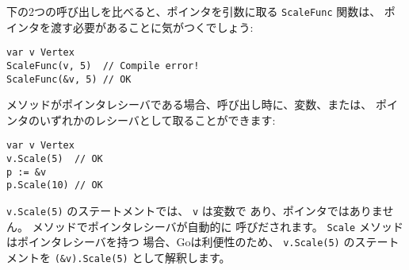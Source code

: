 下の2つの呼び出しを比べると、ポインタを引数に取る \texttt{ScaleFunc} 関数は、
ポインタを渡す必要があることに気がつくでしょう:

\begin{lstlisting}[numbers=none]
var v Vertex
ScaleFunc(v, 5)  // Compile error!
ScaleFunc(&v, 5) // OK
\end{lstlisting}

メソッドがポインタレシーバである場合、呼び出し時に、変数、または、
ポインタのいずれかのレシーバとして取ることができます:

\begin{lstlisting}[numbers=none]
var v Vertex
v.Scale(5)  // OK
p := &v
p.Scale(10) // OK
\end{lstlisting}

\texttt{v.Scale(5)} のステートメントでは、 \texttt{v} は変数で
あり、ポインタではありません。 メソッドでポインタレシーバが自動的に
呼びだされます。 \texttt{Scale} メソッドはポインタレシーバを持つ
場合、Goは利便性のため、 \texttt{v.Scale(5)} のステートメントを
\texttt{(\&v).Scale(5)} として解釈します。